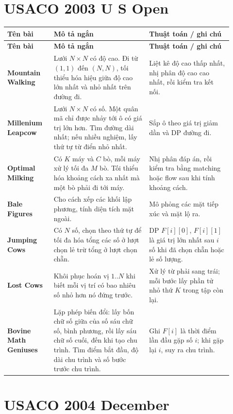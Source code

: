 \documentclass[11pt]{article}
\newenvironment{solutiontable}{%
  \small
  \setlength{\tabcolsep}{4pt}
  \renewcommand{\arraystretch}{1.14}
  \begin{longtable}{L{0.19\linewidth}L{0.39\linewidth}L{0.34\linewidth}}
  \toprule
  \textbf{Tên bài} & \textbf{Mô tả ngắn} & \textbf{Thuật toán / ghi chú}\\
  \midrule
  \endfirsthead
  \toprule
  \textbf{Tên bài} & \textbf{Mô tả ngắn} & \textbf{Thuật toán / ghi chú}\\
  \midrule
  \endhead
}{%
  \bottomrule
  \end{longtable}
  \normalsize
}
\newcommand{\problemrow}[3]{\textbf{#1} & #2 & #3\\\midrule}
\begin{document}
\section{USACO 2003 U S Open}

\begin{solutiontable}
\problemrow{Mountain Walking}{Lưới \(N\times N\) có độ cao. Đi từ \((1,1)\) đến \((N,N)\), tối thiểu hóa hiệu giữa độ cao lớn nhất và nhỏ nhất trên đường đi.}{Liệt kê độ cao thấp nhất, nhị phân độ cao cao nhất, rồi kiểm tra kết nối.}
\problemrow{Millenium Leapcow}{Lưới \(N\times N\) có số. Một quân mã chỉ được nhảy tới ô có giá trị lớn hơn. Tìm đường dài nhất; nếu nhiều nghiệm, lấy thứ tự từ điển nhỏ nhất.}{Sắp ô theo giá trị giảm dần và DP đường đi.}
\problemrow{Optimal Milking}{Có \(K\) máy và \(C\) bò, mỗi máy xử lý tối đa \(M\) bò. Tối thiểu hóa khoảng cách xa nhất mà một bò phải đi tới máy.}{Nhị phân đáp án, rồi kiểm tra bằng matching hoặc flow sau khi tính khoảng cách.}
\problemrow{Bale Figures}{Cho cách xếp các khối lập phương, tính diện tích mặt ngoài.}{Mô phỏng các mặt tiếp xúc và mặt lộ ra.}
\problemrow{Jumping Cows}{Có \(N\) số, chọn theo thứ tự để tối đa hóa tổng các số ở lượt chọn lẻ trừ tổng ở lượt chọn chẵn.}{DP \(F[i][0]\), \(F[i][1]\) là giá trị lớn nhất sau \(i\) số khi đã chọn chẵn hoặc lẻ số lượng.}
\problemrow{Lost Cows}{Khôi phục hoán vị \(1..N\) khi biết mỗi vị trí có bao nhiêu số nhỏ hơn nó đứng trước.}{Xử lý từ phải sang trái; mỗi bước lấy phần tử nhỏ thứ \(K\) trong tập còn lại.}
\problemrow{Bovine Math Geniuses}{Lặp phép biến đổi: lấy bốn chữ số giữa của số sáu chữ số, bình phương, rồi lấy sáu chữ số cuối, đến khi tạo chu trình. Tìm điểm bắt đầu, độ dài chu trình và số bước trước chu trình.}{Ghi \(F[i]\) là thời điểm lần đầu gặp số \(i\); khi gặp lại \(i\), suy ra chu trình.}
\end{solutiontable}

\section{USACO 2004 December}
\end{document}
